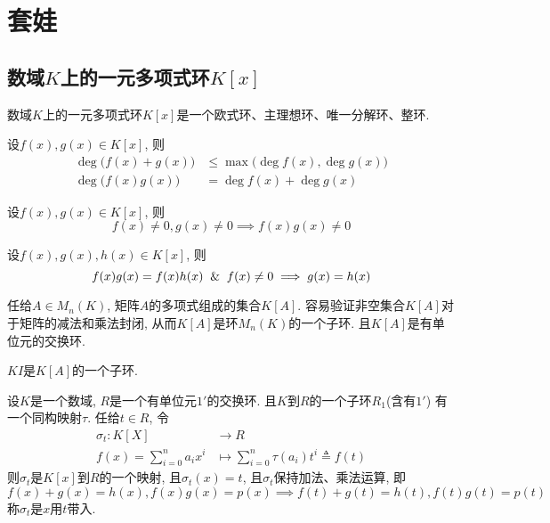 \chapter{套娃}

\section{数域$K$上的一元多项式环$K[x]$} %

\begin{Note}
数域$K$上的一元多项式环$K[x]$是一个欧式环、主理想环、唯一分解环、整环.
\end{Note}

\begin{Property}
设$f(x), g(x) \in K[x]$, 则
\[
\begin{aligned}
\deg \Big( f(x) + g(x) \Big) &\le \max \Big( \deg f(x), \deg g(x) \Big) \\
\deg \Big( f(x) g(x) \Big) &= \deg f(x) + \deg g(x) 
\end{aligned}
\]
\end{Property}

\begin{Corollary}
设$f(x), g(x) \in K[x]$, 则
\[
f(x) \neq 0, g(x) \neq 0 \implies f(x) g(x) \neq 0
\]
\end{Corollary}

\begin{Corollary}[消去律]
设$f(x), g(x), h(x) \in K[x]$, 则
\[
f(x) g(x) = f(x) h(x) \And f(x) \neq 0 \implies g(x) = h(x)
\]
\end{Corollary}


\begin{Note}
任给$A \in M_n(K)$, 矩阵$A$的多项式组成的集合$K[A]$. 容易验证非空集合$K[A]$对于矩阵的减法和乘法封闭, 从而$K[A]$是环$M_n(K)$的一个子环. 且$K[A]$是有单位元的交换环.
\end{Note}

\begin{Note}
$KI$是$K[A]$的一个子环.
\end{Note}

\begin{Theorem}[一元多项式环的通用性质]
设$K$是一个数域, $R$是一个有单位元$1'$的交换环. 且$K$到$R$的一个子环$R_1$(含有$1'$)
有一个同构映射$\tau$. 任给$t \in R$, 令
\[
\begin{aligned}
\sigma_t: K[X] &\rightarrow R \\
          f(x) = \sum\limits_{i=0}^n a_i x^i &\mapsto \sum\limits_{i=0}^n \tau(a_i) t^i \triangleq f(t)
\end{aligned}
\]
则$\sigma_t$是$K[x]$到$R$的一个映射, 且$\sigma_t(x) = t$, 且$\sigma_t$保持加法、乘法运算, 即
\[
f(x) +g(x) = h(x), f(x)g(x) = p(x) \implies f(t) + g(t) = h(t), f(t) g(t) = p(t)
\]
称$\sigma_t$是$x$用$t$带入.
\end{Theorem}

